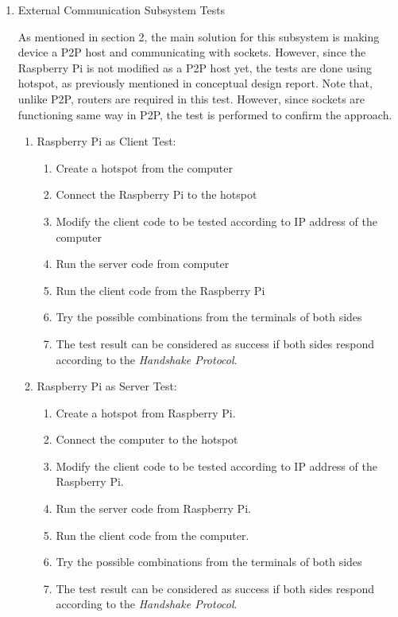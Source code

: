 \documentclass[a4paper,12pt]{article}
\begin{document}
\begin{enumerate}
	
	
	\item {External Communication Subsystem Tests}
		
		As mentioned in section 2, the main solution for this subsystem is making device a P2P host and communicating with sockets. However, since the Raspberry Pi is not modified as a P2P host yet, the tests are done using hotspot, as previously mentioned in conceptual design report. Note that, unlike P2P, routers are required in this test. However, since sockets are functioning same way in P2P, the test is performed to confirm the approach.
		\begin{enumerate}
		
		\item Raspberry Pi as Client Test:

			\begin{enumerate}
				\item Create a hotspot from the computer  
				\item Connect the Raspberry Pi to the hotspot  
				\item Modify the client code to be tested according to IP address of the computer
				\item Run the server code from computer  
				\item Run the client code from the Raspberry Pi  
				\item Try the possible combinations from the terminals of both sides  
				\item The test result can be considered as success if both sides respond according to the \textit{Handshake Protocol}.
			\end{enumerate}		
		
		\item Raspberry Pi as Server Test:
			
			\begin{enumerate}
				\item Create a hotspot from Raspberry Pi.  
				\item Connect the computer to the hotspot  
				\item Modify the client code to be tested according to IP address of the Raspberry Pi.  
				\item Run the server code from Raspberry Pi.  
				\item Run the client code from the computer.  
				\item Try the possible combinations from the terminals of both sides  
				\item The test result can be considered as success if both sides respond according to the \textit{Handshake Protocol}. 
			\end{enumerate}	
		

\end{enumerate}
\end{enumerate}
\end{document}
